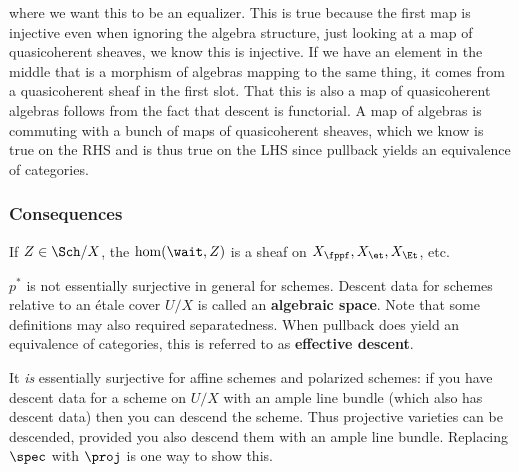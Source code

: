 \begin{center}
\end{center}

where we want this to be an equalizer. This is true because the first
map is injective even when ignoring the algebra structure, just looking
at a map of quasicoherent sheaves, we know this is injective. If we have
an element in the middle that is a morphism of algebras mapping to the
same thing, it comes from a quasicoherent sheaf in the first slot. That
this is also a map of quasicoherent algebras follows from the fact that
descent is functorial. A map of algebras is commuting with a bunch of
maps of quasicoherent sheaves, which we know is true on the RHS and is
thus true on the LHS since pullback yields an equivalence of categories.

\hypertarget{consequences}{%
\subsubsection{Consequences}\label{consequences}}

\begin{corollary}[?]

If \(Z \in \Sch/X\), the \(\hom(\wait, Z)\) is a sheaf on
\(X_{\fppf}, X_{\et}, X_{\Et}\), etc.

\end{corollary}

\begin{remark}

\(p^*\) is not essentially surjective in general for schemes. Descent
data for schemes relative to an étale cover \(U/X\) is called an
\textbf{algebraic space}. Note that some definitions may also required
separatedness. When pullback does yield an equivalence of categories,
this is referred to as \textbf{effective descent}.

It \emph{is} essentially surjective for affine schemes and polarized
schemes: if you have descent data for a scheme on \(U/X\) with an ample
line bundle (which also has descent data) then you can descend the
scheme. Thus projective varieties can be descended, provided you also
descend them with an ample line bundle. Replacing \(\spec\) with
\(\proj\) is one way to show this.

\end{remark}


